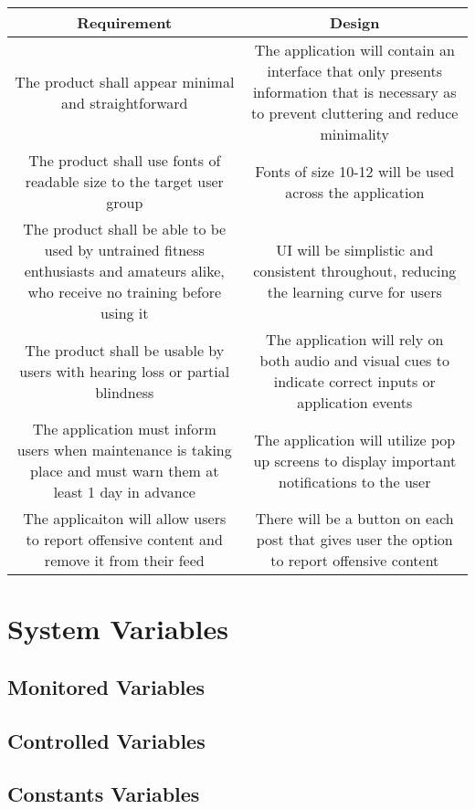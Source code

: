 \documentclass[12pt, titlepage]{article}
\begin{document}
	\begin{tabular}{|c|c|}
		\hline
		Requirement & Design \\
		\hline
		The product shall appear minimal and straightforward & The application will contain an interface that only presents information that is necessary as to prevent cluttering and reduce minimality \\
		\hline
		The product shall use fonts of readable size to the target user group & Fonts of size 10-12 will be used across the application \\
		\hline
		The product shall be able to be used by untrained fitness enthusiasts and amateurs alike, who receive no training before using it & UI will be simplistic and consistent throughout, reducing the learning curve for users \\
		\hline
		The product shall be usable by users with hearing loss or partial blindness & The application will rely on both audio and visual cues to indicate correct inputs or application events \\
		\hline
		The application must inform users when maintenance is taking place and must warn them at least 1 day in advance & The application will utilize pop up screens to display important notifications to the user \\
		\hline
		The applicaiton will allow users to report offensive content and remove it from their feed & There will be a button on each post that gives user the option to report offensive content \\
		\hline

	\end{tabular}
	
	\section{System Variables}
	
	
	\subsection{Monitored Variables}
	
	\subsection{Controlled Variables}
	
	\subsection{Constants Variables}
	
\end{document}
